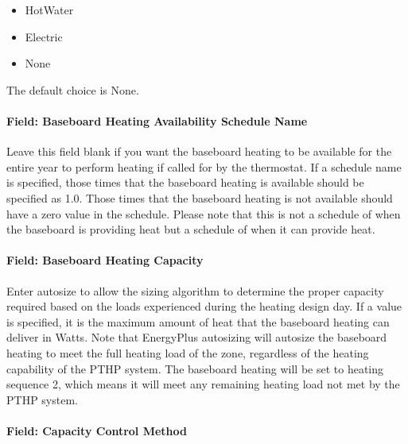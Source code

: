 \begin{itemize}
\item
  HotWater
\item
  Electric
\item
  None
\end{itemize}

The default choice is None.

\paragraph{Field: Baseboard Heating Availability Schedule Name}\label{field-baseboard-heating-availability-schedule-name-3}

Leave this field blank if you want the baseboard heating to be available for the entire year to perform heating if called for by the thermostat. If a schedule name is specified, those times that the baseboard heating is available should be specified as 1.0. Those times that the baseboard heating is not available should have a zero value in the schedule. Please note that this is not a schedule of when the baseboard is providing heat but a schedule of when it can provide heat.

\paragraph{Field: Baseboard Heating Capacity}\label{field-baseboard-heating-capacity-3}

Enter autosize to allow the sizing algorithm to determine the proper capacity required based on the loads experienced during the heating design day. If a value is specified, it is the maximum amount of heat that the baseboard heating can deliver in Watts. Note that EnergyPlus autosizing will autosize the baseboard heating to meet the full heating load of the zone, regardless of the heating capability of the PTHP system. The baseboard heating will be set to heating sequence 2, which means it will meet any remaining heating load not met by the PTHP system.

\paragraph{Field: Capacity Control Method}


